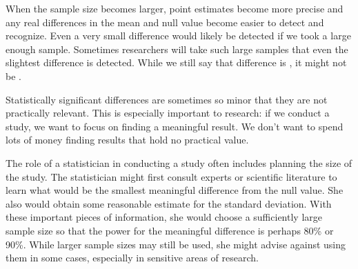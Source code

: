 When the sample size becomes larger, point estimates become more precise and any real differences in the mean and null value become easier to detect and recognize. Even a very small difference would likely be detected if we took a large enough sample. Sometimes researchers will take such large samples that even the slightest difference is detected. While we still say that difference is , it might not be .

Statistically significant differences are sometimes so minor that they are not practically relevant. This is especially important to research: if we conduct a study, we want to focus on finding a meaningful result. We don't want to spend lots of money finding results that hold no practical value.

The role of a statistician in conducting a study often includes planning the size of the study. The statistician might first consult experts or scientific literature to learn what would be the smallest meaningful difference from the null value. She also would obtain some reasonable estimate for the standard deviation. With these important pieces of information, she would choose a sufficiently large sample size so that the power for the meaningful difference is perhaps 80\% or 90\%. While larger sample sizes may still be used, she might advise against using them in some cases, especially in sensitive areas of research.




